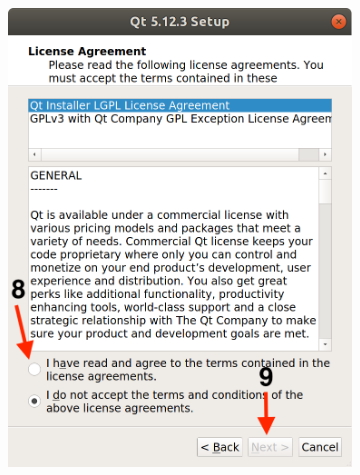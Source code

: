 \begin{figure}[H]
\begin{subfigure}{0.32\linewidth}
        \includegraphics[width=1\textwidth]{images/Qt7.png}
    \end{subfigure}
    \begin{subfigure}{0.32\linewidth}

\end{subfigure}
\end{figure}
